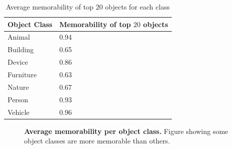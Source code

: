 \begin{table}
\begin{center}
    \begin{tabular}{| l | l |}
    \hline
    Object Class & Memorability of top $20$ objects \\ \hline
    Animal & 0.94  \\ \hline
    Building & 0.65  \\ \hline
    Device & 0.86  \\ \hline
    Furniture & 0.63  \\ \hline
    Nature & 0.67  \\ \hline
    Person & 0.93  \\ \hline
    Vehicle & 0.96  \\ \hline
    \end{tabular}
\end{center}
\caption {Average memorability of top $20$ objects for each class} \label{tab:avgMem}
\end{table}


\begin{figure}[t]
\centering
{}
\vspace{-5mm}\caption{\footnotesize\textbf{Average memorability per object class.} Figure showing some object classes are more memorable than others. }\label{fig:avgMem}
\end{figure} 